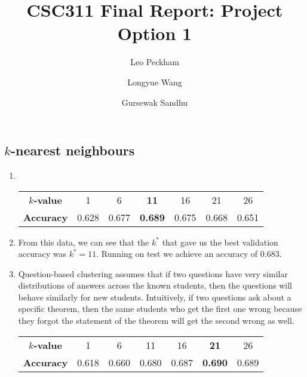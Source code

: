 \documentclass{article}
\title{CSC311 Final Report: Project Option 1}
\author[]{Leo Peckham}
\author[]{Longyue Wang}
\author[]{Gursewak Sandhu}
\affil[]{}
\date{}
\newenvironment{mcfigure}
    {\par\noindent\minipage{\linewidth}}
    {\endminipage\par}
\begin{document}
\maketitle

\begin{multicols}{2}

\section{}

\subsection{$k$-nearest neighbours}

\begin{enumerate}

\item
~
\vspace{-0.2cm}
\begin{mcfigure}
    \centering
    
    {\footnotesize
        \setlength{\tabcolsep}{3pt}
        \begin{tabular}{ |c|c|c|c|c|c|c| } 
            \hline
            \textbf{$k$-value} & 1 & 6 & {\bf 11} & 16 & 21 & 26 \\ 
            \textbf{Accuracy} & 0.628 & 0.677 & {\bf 0.689}
                              & 0.675 & 0.668 & 0.651 \\ 
            \hline
        \end{tabular}
    }
    \label{fig:userclustering}
\end{mcfigure}


\item
From this data, we can see that the $k^*$ that gave us the best validation
accuracy was $k^* = 11$. Running on test we achieve an accuracy of $0.683$.

\item
Question-based clustering assumes that if two questions have very similar
distributions of answers across the known students, then the questions will
behave similarly for new students. Intuitively, if two questions ask about a
specific theorem, then the same students who get the first one wrong because
they forgot the statement of the theorem will get the second wrong as well.

\begin{mcfigure}
    \centering
    
    {\footnotesize
        \setlength{\tabcolsep}{3pt}
        \begin{tabular}{ |c|c|c|c|c|c|c| } 
            \hline
            \textbf{$k$-value} & 1 & 6 & 11 & 16 & {\bf 21} & 26 \\ 
            \textbf{Accuracy} & 0.618 & 0.660 & 0.680
                              & 0.687 & {\bf 0.690} & 0.689 \\ 
            \hline
        \end{tabular}
    }
    \label{fig:questionclustering}
\end{mcfigure}


\end{enumerate}
\end{multicols}
\end{document}
